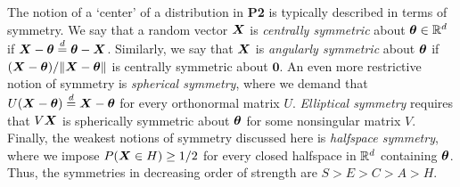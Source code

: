 The notion of a `center' of a distribution in \textbf{P2} is typically
described in terms of symmetry.
We say that a random vector $\bm{X}$ is \emph{centrally symmetric} about
$\bm{\theta} \in \mathbb{R}^d$ if $\bm{X} - \bm{\theta} \overset{d}{=} \bm{\theta} - \bm{X}$.
Similarly, we say that $\bm{X}$ is \emph{angularly symmetric} about $\bm{\theta}$ if
$(\bm{X} - \bm{\theta}) / \Vert \bm{X} - \bm{\theta} \Vert$ is centrally symmetric about $\bm0$.
An even more restrictive notion of symmetry is \emph{spherical symmetry},
where we demand that $U(\bm{X} - \bm{\theta}) \overset{d}{=} \bm{X} - \bm{\theta}$ for every orthonormal
matrix $U$.
\emph{Elliptical symmetry} requires that $V\bm{X}$ is spherically symmetric about
$\bm{\theta}$ for some nonsingular matrix $V$.
Finally, the weakest notions of symmetry discussed here is \emph{halfspace
symmetry}, where we impose $P(\bm{X} \in H) \geq 1/2$ for every closed halfspace
in $\mathbb{R}^d$ containing $\bm{\theta}$.
Thus, the symmetries in decreasing order of strength are $S > E > C > A > H$.














